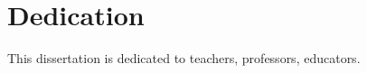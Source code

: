 \chapter*{Dedication}
\label{ch:dedication}

This dissertation is dedicated to teachers, professors, educators.